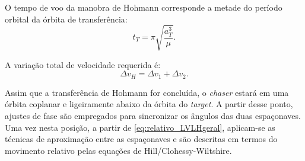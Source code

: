 O tempo de voo da manobra de Hohmann corresponde a metade do período orbital da órbita de transferência:
\begin{equation}
    t_T = \pi \sqrt{\frac{a_T^3}{\mu}}.
\end{equation}

A variação total de velocidade requerida é:
\begin{equation}
    \Delta v_{H} = \Delta v_1 + \Delta v_2.
\end{equation}

Assim que a transferência de Hohmann for concluída, o \emph{chaser} estará em uma órbita coplanar e ligeiramente abaixo da órbita do \emph{target}. 
A partir desse ponto, ajustes de fase são empregados para sincronizar os ângulos das duas espaçonaves. 
Uma vez nesta posição, a partir de \eqref{eq:relativo_LVLHgeral}, aplicam-se as técnicas de aproximação entre as espaçonaves e são descritas em termos do movimento relativo pelas equações de Hill/Clohessy-Wiltshire.
